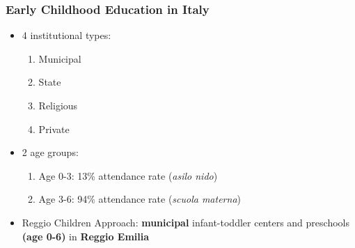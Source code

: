 \documentclass{beamer}
\begin{document}
\begin{frame}
\frametitle{Early Childhood Education in Italy}\label{frame:ECE_IT}
\begin{itemize}
	\item 4 institutional types: \hyperlink{fig:PrivateAsiloIT}{}
	\begin{enumerate}
		\item Municipal
		\item State
		\item Religious
		\item Private
	\end{enumerate}
	\vspace{1ex}
	\item 2 age groups: \hyperlink{fig:AttendaceAsiloIT}{}
	\begin{enumerate}
		\item Age 0-3: 13\% attendance rate (\textit{asilo nido})
		\item Age 3-6: 94\% attendance rate (\textit{scuola materna})
	\end{enumerate}
	
	\vspace{3ex}
	
	\item[] Reggio Children Approach: \textbf{municipal} infant-toddler centers and preschools \textbf{(age 0-6)} in \textbf{Reggio Emilia}
\end{itemize} 
\end{frame} 
\end{document}
